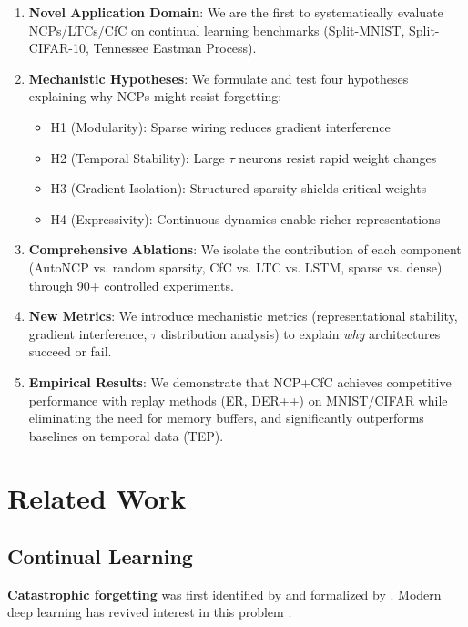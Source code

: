 \documentclass[11pt,twocolumn]{article}
\begin{document}
\begin{enumerate}
    \item \textbf{Novel Application Domain}: We are the first to systematically evaluate NCPs/LTCs/CfC on continual learning benchmarks (Split-MNIST, Split-CIFAR-10, Tennessee Eastman Process).
    
    \item \textbf{Mechanistic Hypotheses}: We formulate and test four hypotheses explaining why NCPs might resist forgetting:
    \begin{itemize}
        \item H1 (Modularity): Sparse wiring reduces gradient interference
        \item H2 (Temporal Stability): Large $\tau$ neurons resist rapid weight changes
        \item H3 (Gradient Isolation): Structured sparsity shields critical weights
        \item H4 (Expressivity): Continuous dynamics enable richer representations
    \end{itemize}
    
    \item \textbf{Comprehensive Ablations}: We isolate the contribution of each component (AutoNCP vs. random sparsity, CfC vs. LTC vs. LSTM, sparse vs. dense) through 90+ controlled experiments.
    
    \item \textbf{New Metrics}: We introduce mechanistic metrics (representational stability, gradient interference, $\tau$ distribution analysis) to explain \textit{why} architectures succeed or fail.
    
    \item \textbf{Empirical Results}: We demonstrate that NCP+CfC achieves competitive performance with replay methods (ER, DER++) on MNIST/CIFAR while eliminating the need for memory buffers, and significantly outperforms baselines on temporal data (TEP).
\end{enumerate}

\section{Related Work}

\subsection{Continual Learning}

\textbf{Catastrophic forgetting} was first identified by \citet{mccloskey1989catastrophic} and formalized by \citet{french1999catastrophic}. Modern deep learning has revived interest in this problem \cite{goodfellow2013empirical}.
\end{document}
